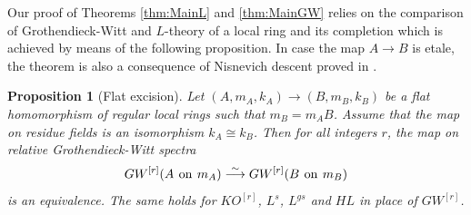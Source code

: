\documentclass[10pt,twoside,a4paper,reqno]{amsart}
\newtheorem{proposition}[theorem]{Proposition}
\theoremstyle{definition}
\numberwithin{equation}{section}
\renewcommand{\|}{\operatorname{|}}
\newcommand{\on}{\hspace{.5ex}\operatorname{on}\hspace{.5ex}}
\begin{document}
Our proof of Theorems \ref{thm:MainL} and \ref{thm:MainGW} relies on the comparison of Grothendieck-Witt and $L$-theory of a local ring and its completion which is achieved by means of the following proposition.
In case the map $A \to B$ is etale, the theorem is also a consequence of Nisnevich descent proved in \cite[Corollary 4.4.2]{CHN}.


\begin{proposition}[Flat excision]
\label{prop:FlatExc}
Let $(A, m_A,k_A) \to (B,m_B,k_B)$ be a flat homomorphism of regular local rings such that $m_B=m_AB$.
Assume that the map on residue fields is an isomorphism $k_A \cong k_B$.
Then for all integers $r$, the map on relative Grothendieck-Witt spectra 
$$GW^{[r]}(A \on m_A) \stackrel{\sim}{\longrightarrow} GW^{[r]}(B\on m_B)$$
is an equivalence.
The same holds for $KO^{[r]}$, $L^s$, $L^{gs}$ and $HL$ in place of $GW^{[r]}$.
\end{proposition}
\end{document}
